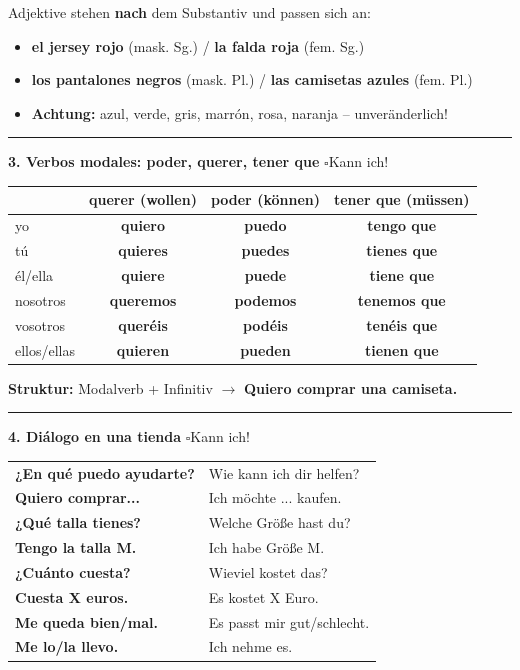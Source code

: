 \documentclass[10pt, a4paper]{article}
\newcommand{\es}[1]{\textcolor{spanisch}{\textbf{#1}}}
\newcommand{\checkbox}{$\square$\hspace{5pt}}
\begin{document}
\begin{themabox}
\small
Adjektive stehen \textbf{nach} dem Substantiv und passen sich an:
\begin{itemize}[leftmargin=15pt, itemsep=1pt]
    \item \es{el jersey rojo} (mask. Sg.) / \es{la falda roja} (fem. Sg.)
    \item \es{los pantalones negros} (mask. Pl.) / \es{las camisetas azules} (fem. Pl.)
    \item \textbf{Achtung:} azul, verde, gris, marrón, rosa, naranja -- unveränderlich!
\end{itemize}

\vspace{3pt}
\hrule
\vspace{3pt}

\textbf{\textcolor{spanisch}{3. Verbos modales: poder, querer, tener que}} \hfill \checkbox Kann ich!

\small
\begin{tabular}{l|ccc}
& \textbf{querer} (wollen) & \textbf{poder} (können) & \textbf{tener que} (müssen) \\
\hline
yo & \es{quiero} & \es{puedo} & \es{tengo que} \\
tú & \es{quieres} & \es{puedes} & \es{tienes que} \\
él/ella & \es{quiere} & \es{puede} & \es{tiene que} \\
nosotros & \es{queremos} & \es{podemos} & \es{tenemos que} \\
vosotros & \es{queréis} & \es{podéis} & \es{tenéis que} \\
ellos/ellas & \es{quieren} & \es{pueden} & \es{tienen que} \\
\end{tabular}

\vspace{3pt}
\textbf{Struktur:} Modalverb + Infinitiv $\rightarrow$ \es{Quiero comprar una camiseta.}

\vspace{3pt}
\hrule
\vspace{3pt}

\textbf{\textcolor{spanisch}{4. Diálogo en una tienda}} \hfill \checkbox Kann ich!

\small
\begin{tabular}{ll}
\es{¿En qué puedo ayudarte?} & Wie kann ich dir helfen? \\
\es{Quiero comprar...} & Ich möchte ... kaufen. \\
\es{¿Qué talla tienes?} & Welche Größe hast du? \\
\es{Tengo la talla M.} & Ich habe Größe M. \\
\es{¿Cuánto cuesta?} & Wieviel kostet das? \\
\es{Cuesta X euros.} & Es kostet X Euro. \\
\es{Me queda bien/mal.} & Es passt mir gut/schlecht. \\
\es{Me lo/la llevo.} & Ich nehme es. \\
\end{tabular}


\end{themabox}
\end{document}
